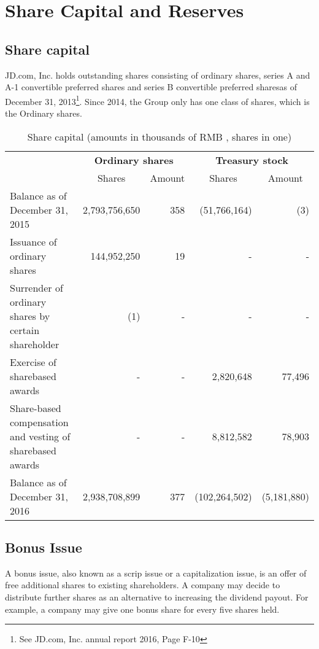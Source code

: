 \section{Share Capital and Reserves}

\subsection{Share capital}

JD.com, Inc. holds outstanding shares consisting of ordinary shares, series A and A-1 convertible preferred shares and series B convertible preferred sharesas of December 31, 2013\footnote{See JD.com, Inc. annual report 2016, Page F-10}. Since 2014, the Group only has one class of shares, which is the Ordinary shares.

\renewcommand{\arraystretch}{0.83}
\begin{table}[H]	
	\begin{center}
		\begin{tabular}{p{5.6cm}rrrr}
			\toprule 
			& \multicolumn{2}{c}{\textbf{Ordinary shares}} & \multicolumn{2}{c}{\textbf{Treasury stock}} \\\cmidrule(lr){2-3} \cmidrule(lr){4-5} 
			\multirow{-2}{*}{} &\multicolumn{1}{c}{Shares}&Amount&\multicolumn{1}{c}{Shares}&\multicolumn{1}{c}{Amount}\\
		\midrule
		\rowcolor[gray]{.96}	
		Balance as of
		December 31,
		2015&2,793,756,650&358&(51,766,164)&(3)\\
		Issuance of ordinary shares&144,952,250&19&-&-\\
		\rowcolor[gray]{.96}
		Surrender of ordinary shares by certain	shareholder&(1)&-&-&-\\
		Exercise of sharebased	awards&-&-&2,820,648&77,496\\
		\rowcolor[gray]{.96}
		Share-based	compensation and vesting of sharebased	awards&-&-&8,812,582&78,903\\
		Balance as of December 31, 2016&2,938,708,899&377&(102,264,502)&(5,181,880)\\
		\bottomrule
		\end{tabular}
	\end{center}
	\caption{Share capital (amounts in thousands of RMB \textyen, shares in one)}\label{table:1}
\end{table}


\subsection{Bonus Issue}
A bonus issue, also known as a scrip issue or a capitalization issue, is an offer of free additional shares to existing shareholders. A company may decide to distribute further shares as an alternative to increasing the dividend payout. For example, a company may give one bonus share for every five shares held.


